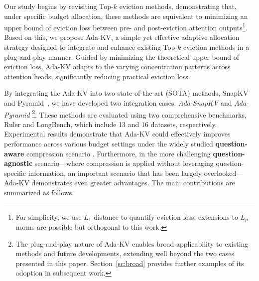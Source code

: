 Our study begins by revisiting Top-$k$ eviction methods, demonstrating that, under specific budget allocation, these methods are equivalent to minimizing an upper bound of eviction loss between pre- and post-eviction attention outputs\footnote{For simplicity, we use $L_1$
  distance to quantify eviction loss; extensions to $L_p$
  norms are possible but orthogonal to this work.}. Based on this, we propose Ada-KV, a simple yet effective adaptive allocation strategy designed to integrate and enhance existing Top-$k$ eviction methods in a plug-and-play manner.
Guided by minimizing the theoretical upper bound of eviction loss, Ada-KV adapts to the varying concentration patterns across attention heads, significantly reducing practical eviction loss.


By integrating the Ada-KV into two state-of-the-art (SOTA) methods, SnapKV \cite{SnapKV} and Pyramid~\cite{PyramidInfer,PyramidKV}, we have developed two integration cases: {\it Ada-SnapKV} and {\it Ada-Pyramid} 
\footnote{
	 The plug-and-play nature of Ada-KV enables broad applicability to existing methods and future developments, extending well beyond the two cases presented in this paper. Section~\ref{sc:broad} provides further examples of its adoption in subsequent work.}.
These methods are evaluated using two comprehensive benchmarks, Ruler and LongBench, which include 13 and 16 datasets, respectively.
Experimental results demonstrate that Ada-KV could effectively improves performance across various budget settings under the widely studied \textbf{question-aware} compression scenario \cite{SnapKV,PyramidKV,H2o}.
 Furthermore, in the more challenging \textbf{question-agnostic} \cite{kvpress} scenario---where compression is applied without leveraging question-specific information, an important scenario that has been largely overlooked---Ada-KV demonstrates even greater advantages.
The main contributions are summarized as follows.

